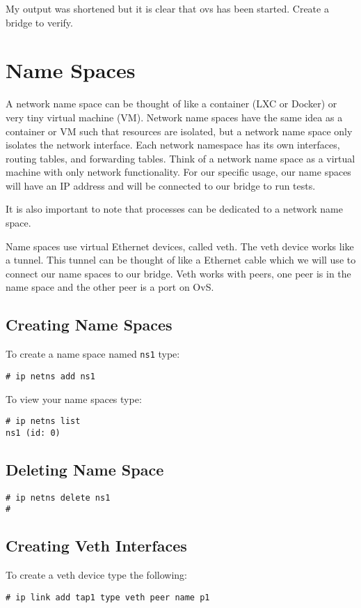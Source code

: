\documentclass[letter]{article}
\begin{document}
{{\begin{appendices}
{My output was shortened but it is clear that ovs has been started. Create a bridge to verify.

\section{Name Spaces}
\label{appendix:ns}
A network name space can be thought of like a container (LXC or Docker) or very tiny virtual machine (VM). Network name spaces have the same idea as a container or VM such that resources are isolated, but a network name space only isolates the network interface. Each network namespace has its own interfaces, routing tables, and forwarding tables. Think of a network name space as a virtual machine with only network functionality. For our specific usage, our name spaces will have an IP address and will be connected to our bridge to run tests.

It is also important to note that processes can be dedicated to a network name space.

Name spaces use virtual Ethernet devices, called veth. The veth device works like a tunnel. This tunnel can be thought of like a Ethernet cable which we will use to connect our name spaces to our bridge. Veth works with peers, one peer is in the name space and the other peer is a port on OvS. 

\subsection{Creating Name Spaces}
To create a name space named \texttt{ns1} type:
\begin{lstlisting}
# ip netns add ns1
\end{lstlisting}

To view your name spaces type:
\begin{lstlisting}
# ip netns list
ns1 (id: 0) 
\end{lstlisting}

\subsection{Deleting Name Space}
\begin{lstlisting}
# ip netns delete ns1
#
\end{lstlisting}

\subsection{Creating Veth Interfaces}
To create a veth device type the following:
\begin{lstlisting}
# ip link add tap1 type veth peer name p1
\end{lstlisting}

}
\end{appendices}}}
\end{document}
